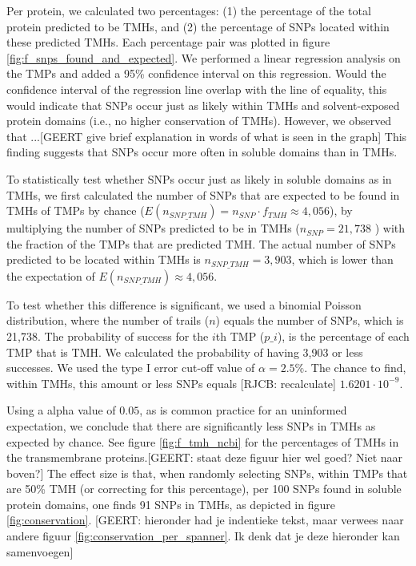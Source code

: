 Per protein, we calculated two percentages: 
(1) the percentage of the total protein predicted to be  TMHs, 
and (2) the percentage of SNPs located within these predicted TMHs.
Each percentage pair was plotted in figure \ref{fig:f_snps_found_and_expected}.
We performed a linear regression analysis on the TMPs
and added a 95\% confidence interval on this regression.
Would the confidence interval of the regression line 
overlap with the line of equality,
this would indicate that SNPs occur just as likely within TMHs 
and solvent-exposed protein domains (i.e., no higher conservation of TMHs). However, we observed that ...[GEERT give brief explanation in words of what is seen in the graph]
This finding suggests that SNPs 
occur more often in soluble domains than in TMHs.

To statistically test whether SNPs occur 
just as likely in soluble domains as
in TMHs, we first calculated the number of SNPs that are expected to be
found in TMHs of TMPs by chance ($E(n_{SNP\_TMH})= n_{SNP} \cdot f_{TMH} \approx 4,056$), by multiplying the number of SNPs predicted to be in TMHs ($n_{SNP} = 21,738$ ) with the fraction of the TMPs that are predicted TMH. The actual number of SNPs predicted to be located within TMHs
is $n_{SNP\_TMH} = 3,903$, which is lower than the expectation
of $E(n_{SNP\_TMH}) \approx 4,056$.

To test whether this difference is significant,
we used a binomial Poisson distribution, where the number of trails ($n$) equals the number of SNPs, which is 21,738. The probability of success
for the $i$th TMP ($p\_i$), is the percentage of each TMP that is TMH.
We calculated the probability of having 3,903 or less successes.
We used the type I error cut-off value of $\alpha = 2.5\%$.
The chance to find, within TMHs, this amount or less SNPs 
equals [RJCB: recalculate]
$1.6201 \cdot 10^{-9}$.

Using a alpha value of $0.05$, as is common practice for an uninformed
expectation, we conclude that there are significantly less SNPs
in TMHs as expected by chance.
See figure \ref{fig:f_tmh_ncbi} for the percentages of TMHs in the transmembrane proteins.[GEERT: staat deze figuur hier wel goed? Niet naar boven?] The effect size is that, 
when randomly selecting SNPs,
within TMPs that are 50\% TMH (or correcting for this percentage),
per 100 SNPs found in soluble protein domains, 
one finds 91 SNPs in TMHs,
as depicted in figure \ref{fig:conservation}. [GEERT: hieronder had je indentieke tekst, maar verwees naar andere figuur \ref{fig:conservation_per_spanner}. Ik denk dat je deze hieronder kan samenvoegen]


